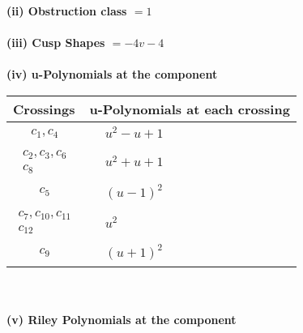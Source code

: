 \documentclass[1p]{elsarticle_modified}
\theoremstyle{definition}
\begin{document}
\flushleft \textbf{(ii) Obstruction class $= 1$}\\~\\
\flushleft \textbf{(iii) Cusp Shapes $= -4 v-4$}\\~\\
\newpage\renewcommand{\arraystretch}{1}
\flushleft \textbf{(iv) u-Polynomials at the component}\newline \\
\begin{tabular}{m{50pt}|m{274pt}}
Crossings & \hspace{64pt}u-Polynomials at each crossing \\
\hline $$\begin{aligned}c_{1},c_{4}\end{aligned}$$&$\begin{aligned}
&u^2- u+1
\end{aligned}$\\
\hline $$\begin{aligned}c_{2},c_{3},c_{6}\\c_{8}\end{aligned}$$&$\begin{aligned}
&u^2+u+1
\end{aligned}$\\
\hline $$\begin{aligned}c_{5}\end{aligned}$$&$\begin{aligned}
&(u-1)^2
\end{aligned}$\\
\hline $$\begin{aligned}c_{7},c_{10},c_{11}\\c_{12}\end{aligned}$$&$\begin{aligned}
&u^2
\end{aligned}$\\
\hline $$\begin{aligned}c_{9}\end{aligned}$$&$\begin{aligned}
&(u+1)^2
\end{aligned}$\\
\hline
\end{tabular}\\~\\
\newpage\renewcommand{\arraystretch}{1}
\flushleft \textbf{(v) Riley Polynomials at the component}\newline \\
\end{document}
